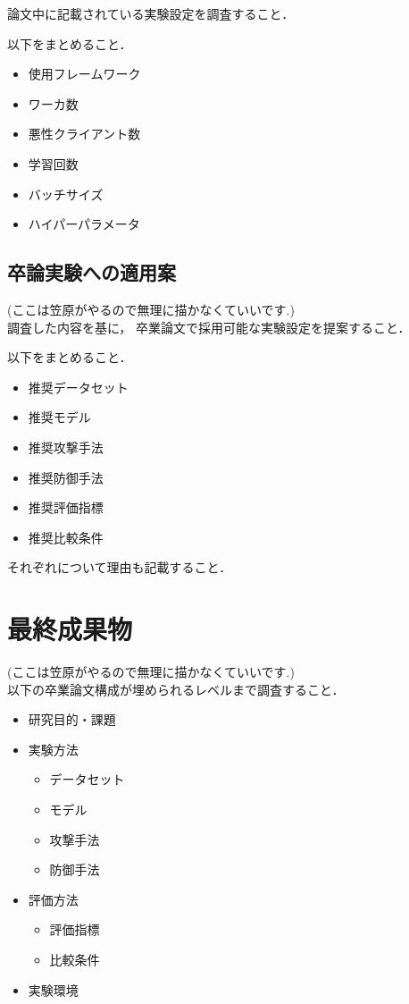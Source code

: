 \documentclass[a4j, twocolumn]{jsarticle}  %
\begin{document}
論文中に記載されている実験設定を調査すること．

以下をまとめること．

\begin{itemize}
    \item 使用フレームワーク
    \item ワーカ数
    \item 悪性クライアント数
    \item 学習回数
    \item バッチサイズ
    \item ハイパーパラメータ
\end{itemize}

\subsection{卒論実験への適用案}
(ここは笠原がやるので無理に描かなくていいです.)\\
調査した内容を基に，
卒業論文で採用可能な実験設定を提案すること．

以下をまとめること．

\begin{itemize}
    \item 推奨データセット
    \item 推奨モデル
    \item 推奨攻撃手法
    \item 推奨防御手法
    \item 推奨評価指標
    \item 推奨比較条件
\end{itemize}

それぞれについて理由も記載すること．



\section{最終成果物}
(ここは笠原がやるので無理に描かなくていいです.)\\
以下の卒業論文構成が埋められるレベルまで調査すること．

\begin{itemize}
    \item 研究目的・課題
    \item 実験方法
    \begin{itemize}
        \item データセット
        \item モデル
        \item 攻撃手法
        \item 防御手法
    \end{itemize}
    \item 評価方法
    \begin{itemize}
        \item 評価指標
        \item 比較条件
    \end{itemize}
    \item 実験環境
\end{itemize}
\end{document}
